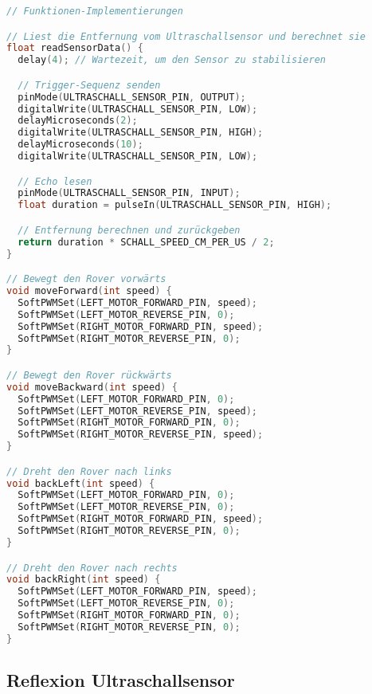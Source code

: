 \documentclass{vorlage-design-main}
\begin{document}
\begin{lstlisting}[language={C++}]
// Funktionen-Implementierungen

// Liest die Entfernung vom Ultraschallsensor und berechnet sie
float readSensorData() {
  delay(4); // Wartezeit, um den Sensor zu stabilisieren

  // Trigger-Sequenz senden
  pinMode(ULTRASCHALL_SENSOR_PIN, OUTPUT);
  digitalWrite(ULTRASCHALL_SENSOR_PIN, LOW);
  delayMicroseconds(2);
  digitalWrite(ULTRASCHALL_SENSOR_PIN, HIGH);
  delayMicroseconds(10);
  digitalWrite(ULTRASCHALL_SENSOR_PIN, LOW);

  // Echo lesen
  pinMode(ULTRASCHALL_SENSOR_PIN, INPUT);
  float duration = pulseIn(ULTRASCHALL_SENSOR_PIN, HIGH);

  // Entfernung berechnen und zurückgeben
  return duration * SCHALL_SPEED_CM_PER_US / 2;
}

// Bewegt den Rover vorwärts
void moveForward(int speed) {
  SoftPWMSet(LEFT_MOTOR_FORWARD_PIN, speed);
  SoftPWMSet(LEFT_MOTOR_REVERSE_PIN, 0);
  SoftPWMSet(RIGHT_MOTOR_FORWARD_PIN, speed);
  SoftPWMSet(RIGHT_MOTOR_REVERSE_PIN, 0);
}

// Bewegt den Rover rückwärts
void moveBackward(int speed) {
  SoftPWMSet(LEFT_MOTOR_FORWARD_PIN, 0);
  SoftPWMSet(LEFT_MOTOR_REVERSE_PIN, speed);
  SoftPWMSet(RIGHT_MOTOR_FORWARD_PIN, 0);
  SoftPWMSet(RIGHT_MOTOR_REVERSE_PIN, speed);
}

// Dreht den Rover nach links
void backLeft(int speed) {
  SoftPWMSet(LEFT_MOTOR_FORWARD_PIN, 0);
  SoftPWMSet(LEFT_MOTOR_REVERSE_PIN, 0);
  SoftPWMSet(RIGHT_MOTOR_FORWARD_PIN, speed);
  SoftPWMSet(RIGHT_MOTOR_REVERSE_PIN, 0);
}

// Dreht den Rover nach rechts
void backRight(int speed) {
  SoftPWMSet(LEFT_MOTOR_FORWARD_PIN, speed);
  SoftPWMSet(LEFT_MOTOR_REVERSE_PIN, 0);
  SoftPWMSet(RIGHT_MOTOR_FORWARD_PIN, 0);
  SoftPWMSet(RIGHT_MOTOR_REVERSE_PIN, 0);
}
\end{lstlisting}

\hypertarget{reflexion-ultraschallsensor}{%
\subsection{Reflexion
Ultraschallsensor}\label{reflexion-ultraschallsensor}}
\end{document}
